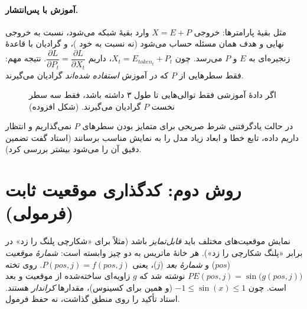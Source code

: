 \paragraph{آموزش با پس‌انتشار.} مثل بقیهٔ پارامترها: خروجی $X=E+P$ وارد بقیهٔ شبکه می‌شود،  نسبت به خروجی نهایی و هدف همان مسئله حساب می‌شود (نه نسبت به خود )، و گرادیان با قاعدهٔ زنجیره‌ای به $E$ و $P$ می‌رسد. چون $X_t=E_{token_t}+P_t$، داریم $\dfrac{\partial L}{\partial P_t}=\dfrac{\partial L}{\partial X_t}$. نتیجه مهم: فقط سطرهایی از $P$ که در آموزش \emph{استفاده شده‌اند} گرادیان می‌گیرند.

\begin{figure}[htbp]
\centering
{}
\caption{اگر دادهٔ آموزشی فقط توالی‌هایی تا طول ۳ داشته باشد، فقط سه سطر نخست $P$ گرادیان می‌گیرند. (شکل افزوده)}
\end{figure}

در حالت یادگرفتنی شرط صریحی برای متمایز بودن سطرهای $P$ نمی‌گذاریم و انتظار داریم داده، تابع خطا و ابعاد زیاد مدل را به نمایش مناسب برسانند (استاد گفت تضمین دقیق آن را می‌شود بیشتر بررسی کرد).

\section{روش دوم: کدگذاری موقعیت ثابت (فرمولی)}
نمایش موقعیت‌های مختلف باید \emph{قابل‌تمایز} باشد (مثلاً برای «شکارچی پلنگ را زد» در برابر «پلنگ شکارچی را زد»). هر خانهٔ ماتریس به دو چیز وابسته است: \emph{شمارهٔ موقعیت} ($pos$) و \emph{شمارهٔ بعد} ($j$)، یعنی $P(pos,j)=f(pos,j)$. روی تخته $PE(pos,j)=\sin\big(g(pos,j)\big)$ نوشته شد که $g$ زاویه‌ای ساخته‌شده از موقعیت و بعد است. چون $-1\le\sin(x)\le 1$ (و همین برای کسینوس)، مقدارها \emph{کراندار} هستند. استاد تأکید را روی منطق گذاشت، نه حفظ فرمول.

